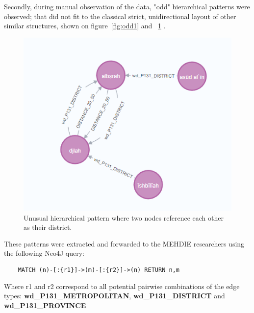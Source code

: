Secondly, during manual observation of the data, "odd" hierarchical patterns were observed;
that did not fit to the classical strict, unidirectional layout of other similar structures, shown on figure~\ref{fig:odd1} and ~\ref{fig:odd2} .

\begin{figure}[h] %
    \centering %
    \includegraphics[width=0.5\linewidth]{figures/odd2} %
    \caption{Unusual hierarchical pattern where two nodes reference each other as their district.} %
    \label{fig:odd2} %
\end{figure}

These patterns were extracted and forwarded to the MEHDIE researchers using the following Neo4J query:
\begin{verbatim}
    MATCH (n)-[:{r1}]->(m)-[:{r2}]->(n) RETURN n,m
\end{verbatim}

Where r1 and r2 correspond to all potential pairwise combinations of the edge types:
\textbf{wd\_P131\_METROPOLITAN}, \textbf{wd\_P131\_DISTRICT} and \textbf{wd\_P131\_PROVINCE}

